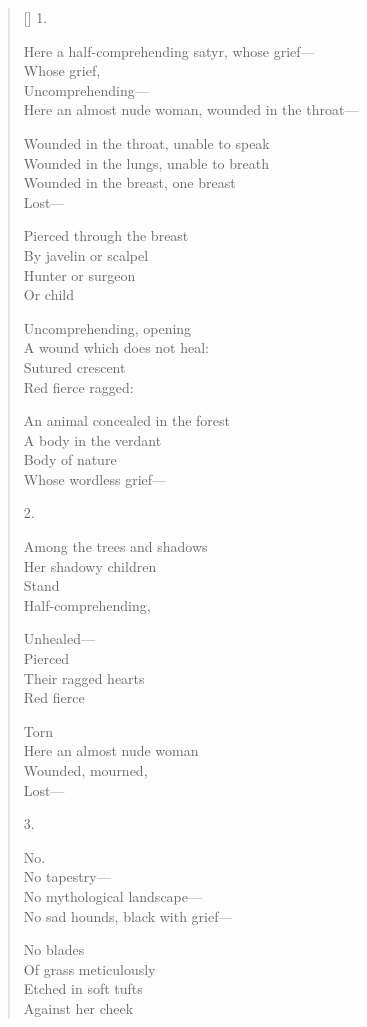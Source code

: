 \begin{verse}[\versewidth]
1.

Here a half-comprehending satyr, whose grief---\\
Whose grief,\\
Uncomprehending---\\
Here an almost nude woman, wounded in the throat---

Wounded in the throat, unable to speak\\
Wounded in the lungs, unable to breath\\
Wounded in the breast, one breast\\
Lost---

Pierced through the breast\\
By javelin or scalpel\\
Hunter or surgeon\\
Or child

Uncomprehending, opening\\
A wound which does not heal:\\
Sutured crescent\\
Red    fierce   ragged:

An animal concealed in the forest\\
A body in the verdant\\
Body of nature\\
Whose wordless grief---

2.

Among the trees and shadows\\
Her shadowy children\\
Stand\\
Half-comprehending,

Unhealed---\\
Pierced\\
Their ragged hearts\\
Red \qquad fierce

Torn\\
Here an almost nude woman\\
Wounded, mourned, \\
Lost---

3.

No.\\
No tapestry---\\
No mythological landscape---\\
No sad hounds, black with grief---

No blades\\
Of grass meticulously\\
Etched in soft tufts \\
Against her cheek


\end{verse}
